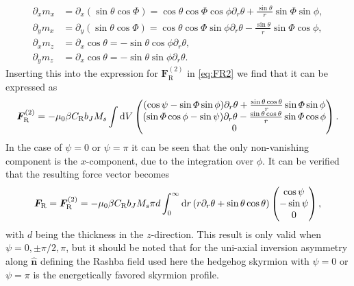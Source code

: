 \begin{subequations}
\begin{align}
    \partial_x m_x &= \partial_x(\sin\theta\cos\Phi) = \cos\theta\cos\Phi\cos\phi\partial_r\theta + \frac{\sin\theta}{r}\sin\Phi\sin\phi, \\
    \partial_y m_x &= \partial_y(\sin\theta\cos\Phi) = \cos\theta\cos\Phi\sin\phi\partial_r\theta - \frac{\sin\theta}{r}\sin\Phi\cos\phi, \\
    \partial_x m_z &= \partial_x\cos\theta = -\sin\theta\cos\phi\partial_r\theta, \\
    \partial_y m_z &= \partial_x\cos\theta = -\sin\theta\sin\phi\partial_r\theta.
\end{align}
\end{subequations}
Inserting this into the expression for $\mathbold{F}_{\text{R}}^{(2)}$ in \eqref{eq:FR2} we find that it can be expressed as
\begin{align}
    \mathbold{F}_{\text{R}}^{(2)} = -\mu_0\beta C_{\text{R}}b_J M_s\int\d V
    \begin{pmatrix}
    (\cos\psi-\sin\Phi\sin\phi)\partial_r\theta+\frac{\sin\theta\cos\theta}{r}\sin\Phi\sin\phi \\
    (\sin\Phi\cos\phi-\sin\psi)\partial_r\theta-\frac{\sin\theta\cos\theta}{r}\sin\Phi\cos\phi \\
    0
    \end{pmatrix}.
\end{align}
In the case of $\psi =0$ or $\psi = \pi$ it can be seen that the only non-vanishing component is the $x$-component, due to the integration over $\phi$. It can be verified that the resulting force vector becomes
\begin{align}
    \mathbold{F}_{\text{R}}=\mathbold{F}_{\text{R}}^{(2)} = -\mu_0\beta C_{\text{R}}b_J M_s\pi d\int_0^{\infty}\d r\left(r\partial_r\theta + \sin\theta\cos\theta\right)
    \begin{pmatrix}
    \cos\psi \\
    -\sin\psi \\
    0
    \end{pmatrix},
\end{align}
with $d$ being the thickness in the $z$-direction. This result is only valid when $\psi = 0, \pm\pi/2, \pi$, but it should be noted that for the uni-axial inversion asymmetry along $\mathbold{\hat{n}}$ defining the Rashba field used here the hedgehog skyrmion with $\psi=0$ or $\psi=\pi$ is the energetically favored skyrmion profile.




